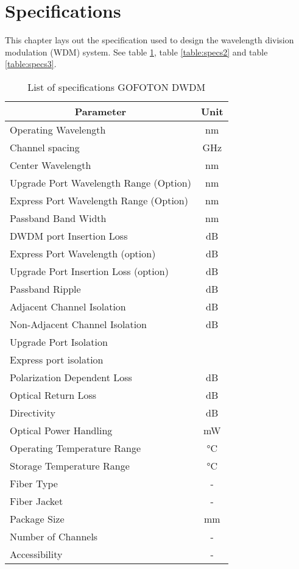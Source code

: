 \section{Specifications}
\label{sec:specifications}
This chapter lays out the specification used to design the wavelength division modulation (WDM) system. See table \ref{table:specs1}, table \ref{table:specs2} and table \ref{table:specs3}.

\begin{table}[!ht]
	\centering
	\cite{noauthor_gofoton_nodate}
	\begin{tabular} {|l|c|}
		\hline
		\multicolumn{1}{|c|}{\textbf{Parameter}} & \textbf{Unit} \\ \hline\hline
		Operating Wavelength & \unit{\nm} \\ \hline
		Channel spacing & \unit{\GHz} \\ \hline
		Center Wavelength & \unit{\nm} \\ \hline
		Upgrade Port Wavelength Range (Option) & \unit{\nm} \\ \hline
		Express Port Wavelength Range (Option) & \unit{\nm} \\ \hline
		Passband Band Width & \unit{\nm} \\ \hline
		DWDM port Insertion Loss & \unit{\dB} \\ \hline
		Express Port Wavelength (option) & \unit{\dB} \\ \hline
		Upgrade Port Insertion Loss (option) & \unit{\dB} \\ \hline
		Passband Ripple & \unit{\dB} \\ \hline
		Adjacent Channel Isolation & \unit{\dB} \\ \hline
		Non-Adjacent Channel Isolation & \unit{\dB} \\ \hline
		Upgrade Port Isolation & \\ \hline
		Express port isolation & \\ \hline
		Polarization Dependent Loss & \unit{\dB} \\ \hline
		Optical Return Loss & \unit{\dB} \\ \hline
		Directivity & \unit{\dB} \\ \hline
		Optical Power Handling & \unit{\mW} \\ \hline
		Operating Temperature Range & \unit{\degreeCelsius} \\ \hline
		Storage Temperature Range & \unit{\degreeCelsius} \\ \hline
		Fiber Type & - \\ \hline
		Fiber Jacket & - \\ \hline
		Package Size & \unit{\mm} \\ \hline
		Number of Channels & - \\ \hline
		Accessibility & - \\ \hline
	\end{tabular}
	\caption{List of specifications GOFOTON DWDM}
	\label{table:specs1}
\end{table}

